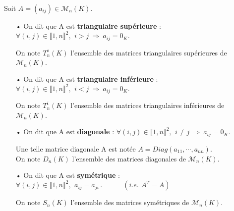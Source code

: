 \vspace{1.2cm}

Soit \(A=(a_{ij})\in \mathcal{M}_n(K)\).\vspace{-0.1cm}
\begin{itemize}[leftmargin=0cm,rightmargin=0cm]
    \item[•] On dit que A est \textbf{triangulaire supérieure} \ssi : \(\forall (i,j)\in \llbracket 1,n \rrbracket^2,\ \,i>j\ \Rightarrow \ a_{ij}=0_K.\)\vspace{0.1cm}\\
    \begin{small}
          On note \(T_n^s(K)\) l'ensemble des matrices triangulaires supérieures de \(\mathcal{M}_n(K)\).
    \end{small}\vspace{0.2cm}
    
    \item[•] On dit que A est \textbf{triangulaire inférieure} \ssi : \(\forall (i,j)\in \llbracket 1,n \rrbracket^2,\ \,i<j\ \Rightarrow \ a_{ij}=0_K.\)\vspace{0.1cm}\\
    \begin{small}
        On note \(T_n^i(K)\) l'ensemble des matrices triangulaires inférieures de \(\mathcal{M}_n(K)\).
    \end{small}\vspace{0.2cm}
    
    \item[•] On dit que A est \textbf{diagonale} \ssi :  \(\forall (i,j)\in \llbracket 1,n \rrbracket^2,\ \,i\neq j\ \Rightarrow \ a_{ij}=0_K.\)\vspace{0.1cm}\\
    \begin{small}
        Une telle matrice diagonale A est notée \(A=Diag(a_{11},\cdots,a_{nn})\).\\
        On note \(D_n(K)\) l'ensemble des matrices diagonales de \(\mathcal{M}_n(K)\).  
    \end{small}\vspace{0.2cm}
    

    \item[•] On dit que A est \textbf{symétrique} \ssi : \(\forall (i,j)\in \llbracket 1,n \rrbracket^2,\ \, a_{ij}=a_{ji}\,.\qquad \quad (i.e.\ \, A^{T}=A)\)\vspace{0.1cm}\\
    \begin{small}
        On note \(S_n(K)\) l'ensemble des matrices symétriques de \(\mathcal{M}_n(K)\).
    \end{small}\vspace{0.2cm}


\end{itemize}
